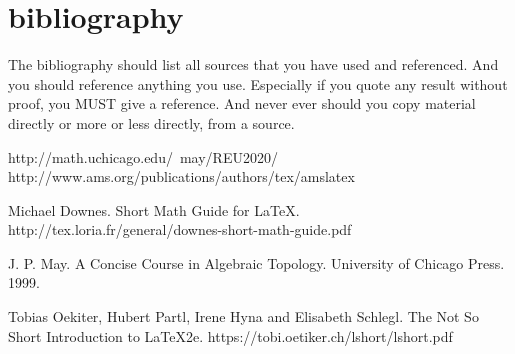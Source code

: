 \documentclass[psamsfonts]{amsart}
\theoremstyle{definition}
\theoremstyle{remark}
\numberwithin{equation}{section}
\begin{document}
\section{bibliography}  The bibliography should list all sources that you have used and referenced.
And you should reference anything you use.   Especially if you quote any result without proof, you MUST
give a reference.   And never ever should you copy material directly or more or less directly, from a source.

\begin{thebibliography}{9}
 http://math.uchicago.edu/~may/REU2020/
 http://www.ams.org/publications/authors/tex/amslatex

Michael Downes.
Short Math Guide for \LaTeX.
http://tex.loria.fr/general/downes-short-math-guide.pdf

J. P. May.
A Concise Course in Algebraic Topology.
University of Chicago Press. 1999. 

Tobias Oekiter, Hubert Partl, Irene Hyna and Elisabeth Schlegl.
The Not So Short Introduction to \LaTeX 2e.
https://tobi.oetiker.ch/lshort/lshort.pdf

\end{thebibliography}
\end{document}
